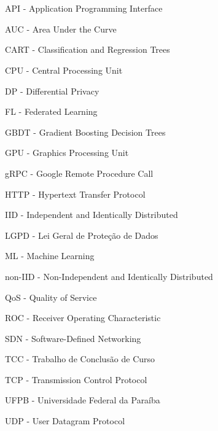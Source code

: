 \section*{}

API - Application Programming Interface

AUC - Area Under the Curve

CART - Classification and Regression Trees

CPU - Central Processing Unit

DP - Differential Privacy

FL - Federated Learning

GBDT - Gradient Boosting Decision Trees

GPU - Graphics Processing Unit

gRPC - Google Remote Procedure Call

HTTP - Hypertext Transfer Protocol

IID - Independent and Identically Distributed

LGPD - Lei Geral de Proteção de Dados

ML - Machine Learning

non-IID - Non-Independent and Identically Distributed

QoS - Quality of Service

ROC - Receiver Operating Characteristic

SDN - Software-Defined Networking

TCC - Trabalho de Conclusão de Curso

TCP - Transmission Control Protocol

UFPB - Universidade Federal da Paraíba

UDP - User Datagram Protocol
